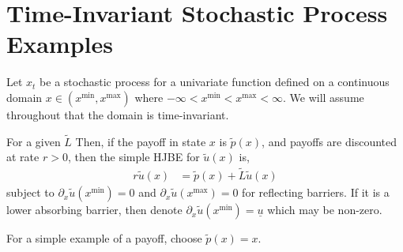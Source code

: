 \documentclass[11pt]{article}
\newcommand{\D}[1][]{\ensuremath{\partial_{#1}}}
\begin{document}
\section{Time-Invariant Stochastic Process Examples}\label{sec:examples}
Let $x_t$ be a stochastic process for a univariate function defined on a continuous domain $x \in (x^{\min}, x^{\max})$ where $-\infty < x^{\min} < x^{\max} < \infty$.  We will assume throughout that the domain is time-invariant.

For a given $\tilde{L}$ Then, if the payoff in state $x$ is $\tilde{p}(x)$, and payoffs are discounted at rate $r > 0$, then the simple HJBE for $\tilde{u}(x)$ is,
\begin{align}
r \tilde{u}(x) &= \tilde{p}(x) + \tilde{L} \tilde{u}(x)\label{eq:general-stationary-HJBE}
\end{align}
subject to $\D[x]\tilde{u}(x^{\min}) = 0$ and $\D[x]\tilde{u}(x^{\max}) = 0$ for reflecting barriers.  If it is a lower absorbing barrier, then denote $\D[x]\tilde{u}(x^{\min}) = \underline{u}$ which may be non-zero.

For a simple example of a payoff, choose $\tilde{p}(x) = x$.
\end{document}
